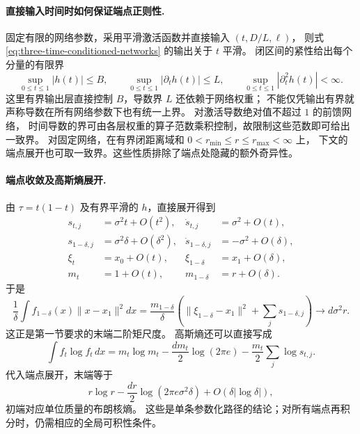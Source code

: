 \documentclass[UTF8,a4paper,11pt,fontset=fandol]{ctexart}
\begin{document}
\paragraph{直接输入时间时如何保证端点正则性.}
固定有限的网络参数，采用平滑激活函数并直接输入 $(t,D/L,\ell)$，
则式 \eqref{eq:three-time-conditioned-networks} 的输出关于 $t$ 平滑。
闭区间的紧性给出每个分量的有限界
\begin{equation}
\sup_{0\le t\le1}|h(t)|\le B,\qquad
\sup_{0\le t\le1}|\partial_t h(t)|\le L,\qquad
\sup_{0\le t\le1}|\partial_t^2 h(t)|<\infty.
\end{equation}
这里有界输出层直接控制 $B$，导数界 $L$ 还依赖于网络权重；
不能仅凭输出有界就声称导数在所有网络参数下也有统一上界。
对激活导数绝对值不超过 $1$ 的前馈网络，
时间导数的界可由各层权重的算子范数乘积控制，故限制这些范数即可给出一致界。
对固定网络，在有界闭距离域和 $0<r_{\min}\le r\le r_{\max}<\infty$ 上，
下文的端点展开也可取一致界。这些性质排除了端点处隐藏的额外奇异性。

\paragraph{端点收敛及高斯熵展开.}
由 $\tau=t(1-t)$ 及有界平滑的 $h$，直接展开得到
\begin{equation}
\begin{aligned}
s_{t,j}&=\sigma^2t+O(t^2),&\dot s_{t,j}&=\sigma^2+O(t),\\
s_{1-\delta,j}&=\sigma^2\delta+O(\delta^2),&
\dot s_{1-\delta,j}&=-\sigma^2+O(\delta),\\
\xi_t&=x_0+O(t),&\xi_{1-\delta}&=x_1+O(\delta),\\
m_t&=1+O(t),&m_{1-\delta}&=r+O(\delta).
\end{aligned}
\end{equation}
于是
\begin{equation}
\frac1\delta\int f_{1-\delta}(x)\|x-x_1\|^2dx
=\frac{m_{1-\delta}}\delta
\left(\|\xi_{1-\delta}-x_1\|^2+\sum_js_{1-\delta,j}\right)
\longrightarrow d\sigma^2r.
\end{equation}
这正是第一节要求的末端二阶矩尺度。
高斯熵还可以直接写成
\begin{equation}
\int f_t\log f_t\,dx
=m_t\log m_t-\frac{dm_t}{2}\log(2\pi e)
-\frac{m_t}{2}\sum_j\log s_{t,j}.
\end{equation}
代入端点展开，末端等于
\begin{equation}
r\log r-\frac{dr}{2}\log(2\pi e\sigma^2\delta)
+O(\delta|\log\delta|),
\end{equation}
初端对应单位质量的布朗核熵。
这些是单条参数化路径的结论；对所有端点再积分时，仍需相应的全局可积性条件。
\end{document}
